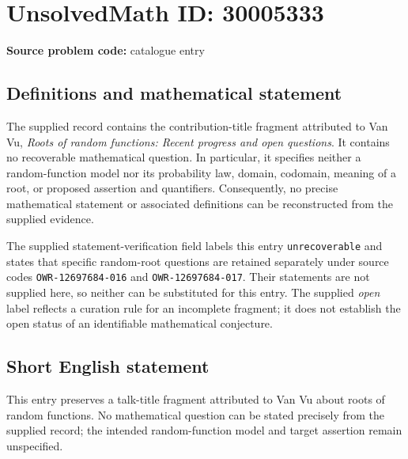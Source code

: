 \documentclass[11pt]{article}
\begin{document}
\section*{UnsolvedMath ID: 30005333}
\textbf{Source problem code:} catalogue entry
\subsection{Definitions and mathematical statement}
The supplied record contains the contribution-title fragment attributed to Van Vu, \emph{Roots of random functions: Recent progress and open questions}. It contains no recoverable mathematical question. In particular, it specifies neither a random-function model nor its probability law, domain, codomain, meaning of a root, or proposed assertion and quantifiers. Consequently, no precise mathematical statement or associated definitions can be reconstructed from the supplied evidence.

The supplied statement-verification field labels this entry \texttt{unrecoverable} and states that specific random-root questions are retained separately under source codes \texttt{OWR-12697684-016} and \texttt{OWR-12697684-017}. Their statements are not supplied here, so neither can be substituted for this entry. The supplied \emph{open} label reflects a curation rule for an incomplete fragment; it does not establish the open status of an identifiable mathematical conjecture.
\subsection{Short English statement}
This entry preserves a talk-title fragment attributed to Van Vu about roots of random functions. No mathematical question can be stated precisely from the supplied record; the intended random-function model and target assertion remain unspecified.
\end{document}
